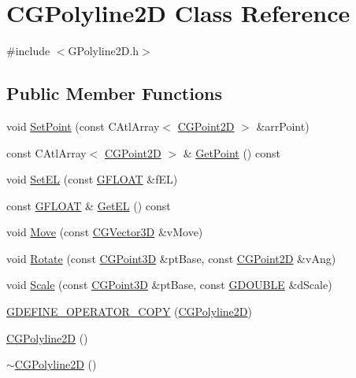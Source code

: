 \hypertarget{class_c_g_polyline2_d}{}\section{C\+G\+Polyline2\+D Class Reference}
\label{class_c_g_polyline2_d}


{\ttfamily \#include $<$G\+Polyline2\+D.\+h$>$}

\subsection*{Public Member Functions}
\begin{DoxyCompactItemize}
\item 
void \hyperlink{class_c_g_polyline2_d_ac8bdf9032253f7274fa89f2af17e9440}{Set\+Point} (const C\+Atl\+Array$<$ \hyperlink{class_c_g_point2_d}{C\+G\+Point2\+D} $>$ \&arr\+Point)
\item 
const C\+Atl\+Array$<$ \hyperlink{class_c_g_point2_d}{C\+G\+Point2\+D} $>$ \& \hyperlink{class_c_g_polyline2_d_a30273ad5c1cdf68b753a72bfd2b809b4}{Get\+Point} () const 
\item 
void \hyperlink{class_c_g_polyline2_d_abdfa8ed5da244836e4afe2d5f7b21dde}{Set\+E\+L} (const \hyperlink{_g_types_8h_abf6eba8223df62f199b811a6c52ff2ef}{G\+F\+L\+O\+A\+T} \&f\+E\+L)
\item 
const \hyperlink{_g_types_8h_abf6eba8223df62f199b811a6c52ff2ef}{G\+F\+L\+O\+A\+T} \& \hyperlink{class_c_g_polyline2_d_a1c4a9c1e1a012c243befb11fa3e6a134}{Get\+E\+L} () const 
\item 
void \hyperlink{class_c_g_polyline2_d_a493a8ae2093b32e4e377b82bd93400e0}{Move} (const \hyperlink{_g_point3_d_8h_aa7e73d39f4c991acb5a13c84b498366d}{C\+G\+Vector3\+D} \&v\+Move)
\item 
void \hyperlink{class_c_g_polyline2_d_adfaf94e86ba0ec3d803fb8810b988148}{Rotate} (const \hyperlink{class_c_g_point3_d}{C\+G\+Point3\+D} \&pt\+Base, const \hyperlink{class_c_g_point2_d}{C\+G\+Point2\+D} \&v\+Ang)
\item 
void \hyperlink{class_c_g_polyline2_d_a74bba6242f52b252c743c7fb6c9d9204}{Scale} (const \hyperlink{class_c_g_point3_d}{C\+G\+Point3\+D} \&pt\+Base, const \hyperlink{_g_types_8h_afd05ac85f90ee8e2a733928545462cd4}{G\+D\+O\+U\+B\+L\+E} \&d\+Scale)
\item 
\hyperlink{class_c_g_polyline2_d_aeee0fa66107d366d119b0b99ac26ffbc}{G\+D\+E\+F\+I\+N\+E\+\_\+\+O\+P\+E\+R\+A\+T\+O\+R\+\_\+\+C\+O\+P\+Y} (\hyperlink{class_c_g_polyline2_d}{C\+G\+Polyline2\+D})
\item 
\hyperlink{class_c_g_polyline2_d_a7184bf521a2c363df52c51263f919bf9}{C\+G\+Polyline2\+D} ()
\item 
\hyperlink{class_c_g_polyline2_d_a98a8f8cd3709cae0d93c593bcda77e06}{$\sim$\+C\+G\+Polyline2\+D} ()
\end{DoxyCompactItemize}


